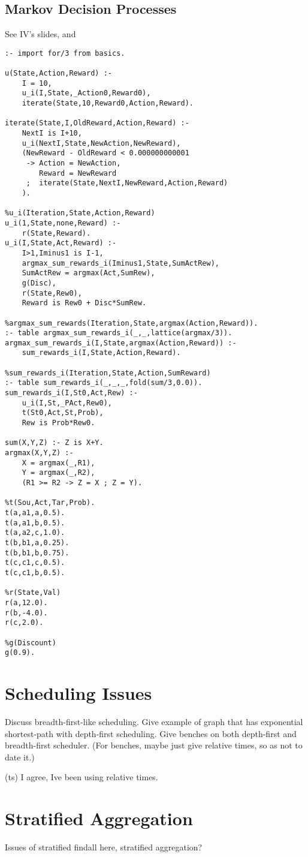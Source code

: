 \subsection{Markov Decision Processes}

See IV's slides, and
\begin{verbatim}
:- import for/3 from basics.

u(State,Action,Reward) :-
	I = 10,
	u_i(I,State,_Action0,Reward0),
	iterate(State,10,Reward0,Action,Reward).

iterate(State,I,OldReward,Action,Reward) :-
	NextI is I+10,
	u_i(NextI,State,NewAction,NewReward),
	(NewReward - OldReward < 0.000000000001
	 ->	Action = NewAction,
		Reward = NewReward
	 ;	iterate(State,NextI,NewReward,Action,Reward)
	).

%u_i(Iteration,State,Action,Reward)
u_i(1,State,none,Reward) :-
	r(State,Reward).
u_i(I,State,Act,Reward) :-
	I>1,Iminus1 is I-1,
	argmax_sum_rewards_i(Iminus1,State,SumActRew),
	SumActRew = argmax(Act,SumRew),
	g(Disc),
	r(State,Rew0),
	Reward is Rew0 + Disc*SumRew.

%argmax_sum_rewards(Iteration,State,argmax(Action,Reward)).
:- table argmax_sum_rewards_i(_,_,lattice(argmax/3)).
argmax_sum_rewards_i(I,State,argmax(Action,Reward)) :-
	sum_rewards_i(I,State,Action,Reward).

%sum_rewards_i(Iteration,State,Action,SumReward)
:- table sum_rewards_i(_,_,_,fold(sum/3,0.0)).
sum_rewards_i(I,St0,Act,Rew) :-
	u_i(I,St,_PAct,Rew0),
	t(St0,Act,St,Prob),
	Rew is Prob*Rew0.

sum(X,Y,Z) :- Z is X+Y.
argmax(X,Y,Z) :-
	X = argmax(_,R1),
	Y = argmax(_,R2),
	(R1 >= R2 -> Z = X ; Z = Y).

%t(Sou,Act,Tar,Prob).
t(a,a1,a,0.5).
t(a,a1,b,0.5).
t(a,a2,c,1.0).
t(b,b1,a,0.25).
t(b,b1,b,0.75).
t(c,c1,c,0.5).
t(c,c1,b,0.5).

%r(State,Val)
r(a,12.0).
r(b,-4.0).
r(c,2.0).

%g(Discount)
g(0.9).
\end{verbatim}


\section{Scheduling Issues}

Discuss breadth-first-like scheduling.  Give example of graph that has
exponential shortest-path with depth-first scheduling.  Give benches
on both depth-first and breadth-first scheduler.  (For benches, maybe
just give relative times, so as not to date it.)

(ts) I agree, Ive been using relative times.

\section{Stratified Aggregation}

Issues of stratified findall here, stratified aggregation?

